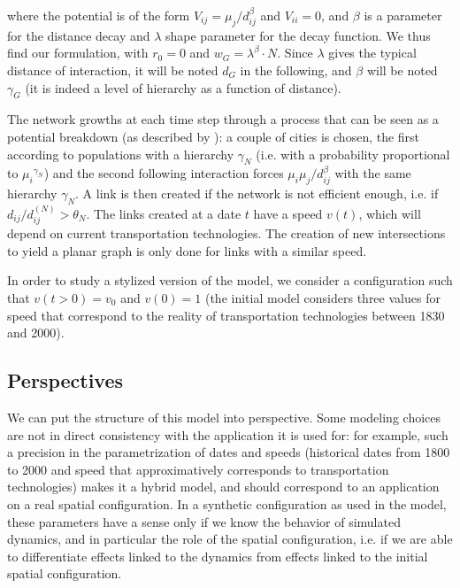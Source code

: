 where the potential is of the form $V_{ij} = \mu_j / d_{ij}^\beta$ and $V_{ii}=0$, and $\beta$ is a parameter for the distance decay and $\lambda$ shape parameter for the decay function. We thus find our formulation, with $r_0 = 0$ and $w_G = \lambda^\beta \cdot N$. Since $\lambda$ gives the typical distance of interaction, it will be noted $d_G$ in the following, and $\beta$ will be noted $\gamma_G$ (it is indeed a level of hierarchy as a function of distance).

The network growths at each time step through a process that can be seen as a potential breakdown (as described by \cite{raimbault:tel-01857741}): a couple of cities is chosen, the first according to populations with a hierarchy $\gamma_N$ (i.e. with a probability proportional to ${\mu_i}^{\gamma_N}$) and the second following interaction forces $\mu_i \mu_j / d_{ij}^\beta$ with the same hierarchy $\gamma_N$. A link is then created if the network is not efficient enough, i.e. if $d_{ij}/d^{(N)}_{ij}> \theta_N$. The links created at a date $t$ have a speed $v(t)$, which will depend on current transportation technologies. The creation of new intersections to yield a planar graph is only done for links with a similar speed.

In order to study a stylized version of the model, we consider a configuration such that $v(t > 0) = v_0$ and $v(0) = 1$ (the initial model considers three values for speed that correspond to the reality of transportation technologies between 1830 and 2000).



\subsection{Perspectives}

We can put the structure of this model into perspective. Some modeling choices are not in direct consistency with the application it is used for: for example, such a precision in the parametrization of dates and speeds (historical dates from 1800 to 2000 and speed that approximatively corresponds to transportation technologies) makes it a hybrid model, and should correspond to an application on a real spatial configuration. In a synthetic configuration as used in the model, these parameters have a sense only if we know the behavior of simulated dynamics, and in particular the role of the spatial configuration, i.e. if we are able to differentiate effects linked to the dynamics from effects linked to the initial spatial configuration.


